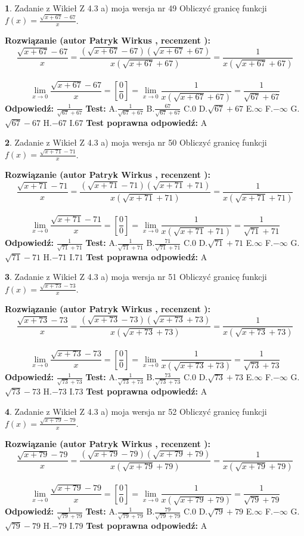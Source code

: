 \documentclass[12pt, a4paper]{article}
\theoremstyle{definition} %
\newtheorem{zad}{}
\newcommand{\zadStart}[1]{\begin{zad}#1\newline}
\newcommand{\zadStop}{\end{zad}}
\newcommand{\rozwStart}[2]{\noindent \textbf{Rozwiązanie (autor #1 , recenzent #2): }\newline}
\newcommand{\rozwStop}{\newline}
\newcommand{\odpStart}{\noindent \textbf{Odpowiedź:}\newline}
\newcommand{\odpStop}{\newline}
\newcommand{\testStart}{\noindent \textbf{Test:}\newline}
\newcommand{\testStop}{\newline}
\newcommand{\kluczStart}{\noindent \textbf{Test poprawna odpowiedź:}\newline}
\newcommand{\kluczStop}{\newline}
\begin{document}
\zadStart{Zadanie z Wikieł Z 4.3 a) moja wersja nr 49}
Obliczyć granicę funkcji $f(x)=\frac{\sqrt{x+67}-67}{x}$.
\zadStop
\rozwStart{Patryk Wirkus}{}
$$\frac{\sqrt{x+67}-67}{x}=\frac{(\sqrt{x+67}-67)(\sqrt{x+67}+67)}{x(\sqrt{x+67}+67)}=\frac{1}{x(\sqrt{x+67}+67)}$$
\\
$$\lim\limits_{x\to0}\frac{\sqrt{x+67}-67}{x}=[\frac{0}{0}]=
\lim\limits_{x\to0}\frac{1}{x(\sqrt{x+67}+67)} = \frac{1}{\sqrt{67}+67}$$
\rozwStop
\odpStart
$\frac{1}{\sqrt{67}+67}$
\odpStop
\testStart
A.$\frac{1}{\sqrt{67}+67}$
B.$\frac{67}{\sqrt{67}+67}$
C.$0$
D.$\sqrt{67}+67$
E.$\infty$
F.$-\infty$
G.$\sqrt{67}-67$
H.$-67$
I.$67$
\testStop
\kluczStart
A
\kluczStop



\zadStart{Zadanie z Wikieł Z 4.3 a) moja wersja nr 50}
Obliczyć granicę funkcji $f(x)=\frac{\sqrt{x+71}-71}{x}$.
\zadStop
\rozwStart{Patryk Wirkus}{}
$$\frac{\sqrt{x+71}-71}{x}=\frac{(\sqrt{x+71}-71)(\sqrt{x+71}+71)}{x(\sqrt{x+71}+71)}=\frac{1}{x(\sqrt{x+71}+71)}$$
\\
$$\lim\limits_{x\to0}\frac{\sqrt{x+71}-71}{x}=[\frac{0}{0}]=
\lim\limits_{x\to0}\frac{1}{x(\sqrt{x+71}+71)} = \frac{1}{\sqrt{71}+71}$$
\rozwStop
\odpStart
$\frac{1}{\sqrt{71}+71}$
\odpStop
\testStart
A.$\frac{1}{\sqrt{71}+71}$
B.$\frac{71}{\sqrt{71}+71}$
C.$0$
D.$\sqrt{71}+71$
E.$\infty$
F.$-\infty$
G.$\sqrt{71}-71$
H.$-71$
I.$71$
\testStop
\kluczStart
A
\kluczStop



\zadStart{Zadanie z Wikieł Z 4.3 a) moja wersja nr 51}
Obliczyć granicę funkcji $f(x)=\frac{\sqrt{x+73}-73}{x}$.
\zadStop
\rozwStart{Patryk Wirkus}{}
$$\frac{\sqrt{x+73}-73}{x}=\frac{(\sqrt{x+73}-73)(\sqrt{x+73}+73)}{x(\sqrt{x+73}+73)}=\frac{1}{x(\sqrt{x+73}+73)}$$
\\
$$\lim\limits_{x\to0}\frac{\sqrt{x+73}-73}{x}=[\frac{0}{0}]=
\lim\limits_{x\to0}\frac{1}{x(\sqrt{x+73}+73)} = \frac{1}{\sqrt{73}+73}$$
\rozwStop
\odpStart
$\frac{1}{\sqrt{73}+73}$
\odpStop
\testStart
A.$\frac{1}{\sqrt{73}+73}$
B.$\frac{73}{\sqrt{73}+73}$
C.$0$
D.$\sqrt{73}+73$
E.$\infty$
F.$-\infty$
G.$\sqrt{73}-73$
H.$-73$
I.$73$
\testStop
\kluczStart
A
\kluczStop



\zadStart{Zadanie z Wikieł Z 4.3 a) moja wersja nr 52}
Obliczyć granicę funkcji $f(x)=\frac{\sqrt{x+79}-79}{x}$.
\zadStop
\rozwStart{Patryk Wirkus}{}
$$\frac{\sqrt{x+79}-79}{x}=\frac{(\sqrt{x+79}-79)(\sqrt{x+79}+79)}{x(\sqrt{x+79}+79)}=\frac{1}{x(\sqrt{x+79}+79)}$$
\\
$$\lim\limits_{x\to0}\frac{\sqrt{x+79}-79}{x}=[\frac{0}{0}]=
\lim\limits_{x\to0}\frac{1}{x(\sqrt{x+79}+79)} = \frac{1}{\sqrt{79}+79}$$
\rozwStop
\odpStart
$\frac{1}{\sqrt{79}+79}$
\odpStop
\testStart
A.$\frac{1}{\sqrt{79}+79}$
B.$\frac{79}{\sqrt{79}+79}$
C.$0$
D.$\sqrt{79}+79$
E.$\infty$
F.$-\infty$
G.$\sqrt{79}-79$
H.$-79$
I.$79$
\testStop
\kluczStart
A
\kluczStop
\end{document}
